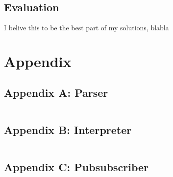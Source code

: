 \documentclass{article}
\begin{document}
\subsection{Evaluation}

I belive this to be the best part of my solutions, blabla


\newpage
\section{Appendix}

\subsection{Appendix A: Parser}
\inputminted{haskell}{eddy/EddyParser.hs}

\newpage
\subsection{Appendix B: Interpreter}
\inputminted{haskell}{eddy/EddyInterp.hs}

\newpage
\subsection{Appendix C: Pubsubscriber}
\inputminted{haskell}{pubsub/pubsub.erl}
\end{document}
